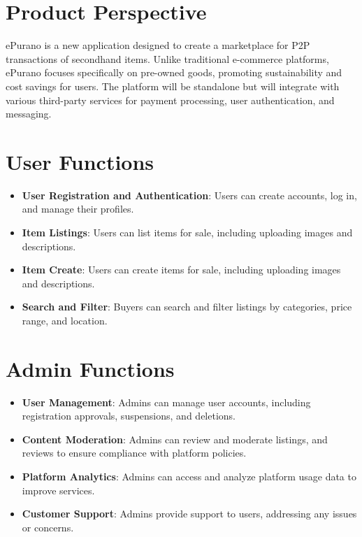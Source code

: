 
\section{Product Perspective}

ePurano is a new application designed to create a marketplace for P2P transactions of secondhand items. Unlike traditional e-commerce platforms, ePurano focuses specifically on pre-owned goods, promoting sustainability and cost savings for users. The platform will be standalone but will integrate with various third-party services for payment processing, user authentication, and messaging.


\section{User Functions}

\begin{itemize}
    \item \textbf{User Registration and Authentication}: Users can create accounts, log in, and manage their profiles.
    \item \textbf{Item Listings}: Users can list items for sale, including uploading images and descriptions.
    \item \textbf{Item Create}: Users can create items for sale, including uploading images and descriptions.
    \item \textbf{Search and Filter}: Buyers can search and filter listings by categories, price range, and location.
\end{itemize}

\section{Admin Functions}

\begin{itemize}
    \item \textbf{User Management}: Admins can manage user accounts, including registration approvals, suspensions, and deletions.
    \item \textbf{Content Moderation}: Admins can review and moderate listings, and reviews to ensure compliance with platform policies.
    \item \textbf{Platform Analytics}: Admins can access and analyze platform usage data to improve services.
    \item \textbf{Customer Support}: Admins provide support to users, addressing any issues or concerns.
\end{itemize}


